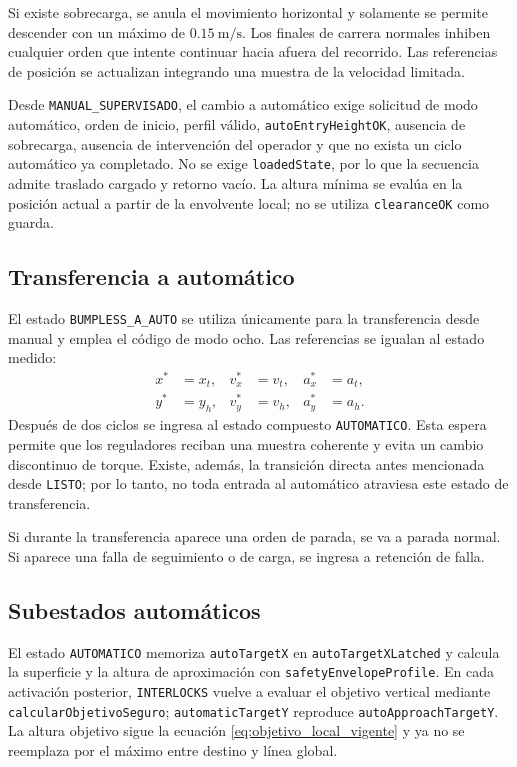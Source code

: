 \documentclass[a4paper,10pt,onecolumn,journal]{ieeeconf}
\numberwithin{equation}{section}
\begin{document}
Si existe sobrecarga, se anula el movimiento horizontal y solamente se permite descender con un máximo de $0.15~\mathrm{m/s}$. Los finales de carrera normales inhiben cualquier orden que intente continuar hacia afuera del recorrido. Las referencias de posición se actualizan integrando una muestra de la velocidad limitada.

Desde \texttt{MANUAL\_SUPERVISADO}, el cambio a automático exige solicitud de modo automático, orden de inicio, perfil válido, \texttt{autoEntryHeightOK}, ausencia de sobrecarga, ausencia de intervención del operador y que no exista un ciclo automático ya completado. No se exige \texttt{loadedState}, por lo que la secuencia admite traslado cargado y retorno vacío. La altura mínima se evalúa en la posición actual a partir de la envolvente local; no se utiliza \texttt{clearanceOK} como guarda.


\subsection{Transferencia a automático}
El estado \texttt{BUMPLESS\_A\_AUTO} se utiliza únicamente para la transferencia desde manual y emplea el código de modo ocho. Las referencias se igualan al estado medido:
\begin{align}
x^*&=x_t,&v_x^*&=v_t,&a_x^*&=a_t,\\
y^*&=y_h,&v_y^*&=v_h,&a_y^*&=a_h.
\end{align}
Después de dos ciclos se ingresa al estado compuesto \texttt{AUTOMATICO}. Esta espera permite que los reguladores reciban una muestra coherente y evita un cambio discontinuo de torque. Existe, además, la transición directa antes mencionada desde \texttt{LISTO}; por lo tanto, no toda entrada al automático atraviesa este estado de transferencia.

Si durante la transferencia aparece una orden de parada, se va a parada normal. Si aparece una falla de seguimiento o de carga, se ingresa a retención de falla.


\subsection{Subestados automáticos}
El estado \texttt{AUTOMATICO} memoriza \texttt{autoTargetX} en \texttt{autoTargetXLatched} y calcula la superficie y la altura de aproximación con \texttt{safetyEnvelopeProfile}. En cada activación posterior, \texttt{INTERLOCKS} vuelve a evaluar el objetivo vertical mediante \texttt{calcularObjetivoSeguro}; \texttt{automaticTargetY} reproduce \texttt{autoApproachTargetY}. La altura objetivo sigue la ecuación \eqref{eq:objetivo_local_vigente} y ya no se reemplaza por el máximo entre destino y línea global.
\end{document}
